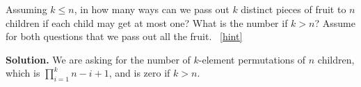 \documentclass{book}
\begin{document}
\setcounter{project}{90}
\addtocounter{project}{-1}
\begin{activity}[]\label{activity-83}
\hypertarget{p-687}{}%
Assuming \(k\le n\), in how many ways can we pass out \(k\) distinct pieces of fruit to \(n\) children if each child may get at most one? What is the number if \(k>n\)? Assume for both questions that we pass out all the fruit.%
~\hfill{\tiny\hyperlink{a-90}{[hint]}\hypertarget{q-90}{}}\par\smallskip%
\noindent\textbf{Solution.}\hypertarget{solution-67}{}\quad%
\hypertarget{p-690}{}%
We are asking for the number of \(k\)-element permutations of \(n\) children, which is \(\prod_{i=1}^k n-i+1\), and is zero if \(k>n\).%
\end{activity}
\end{document}
